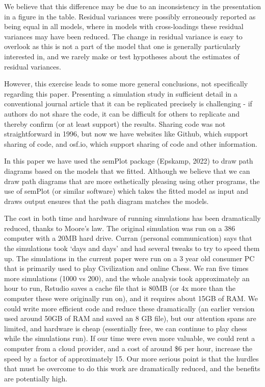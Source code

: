\documentclass[
  letterpaper,
  DIV=11,
  numbers=noendperiod]{scrartcl}
\begin{document}
We believe that this difference may be due to an inconsistency in the
presentation in a figure in the table. Residual variances were possibly
erroneously reported as being equal in all models, where in models with
cross-loadings these residual variances may have been reduced. The
change in residual variance is easy to overlook as this is not a part of
the model that one is generally particularly interested in, and we
rarely make or test hypotheses about the estimates of residual
variances.

However, this exercise leads to some more general conclusions, not
specifically regarding this paper. Presenting a simulation study in
sufficient detail in a conventional journal article that it can be
replicated precisely is challenging - if authors do not share the code,
it can be difficult for others to replicate and thereby confirm (or at
least support) the results. Sharing code was not straightforward in
1996, but now we have websites like Github, which support sharing of
code, and osf.io, which support sharing of code and other information.

In this paper we have used the semPlot package (Epskamp, 2022) to draw
path diagrams based on the models that we fitted. Although we believe
that we can draw path diagrams that are more esthetically pleasing using
other programs, the use of semPlot (or similar software) which takes the
fitted model as input and draws output ensures that the path diagram
matches the models.

The cost in both time and hardware of running simulations has been
dramatically reduced, thanks to Moore's law. The original simulation was
run on a 386 computer with a 20MB hard drive. Curran (personal
communication) says that the simulations took `days and days' and had
several tweaks to try to speed them up. The simulations in the current
paper were run on a 3 year old consumer PC that is primarily used to
play Civilization and online Chess. We ran five times more simulations
(1000 vs 200), and the whole analysis took approximately an hour to run,
Rstudio saves a cache file that is 80MB (or 4x more than the computer
these were originally run on), and it requires about 15GB of RAM. We
could write more efficient code and reduce these dramatically (an
earlier version used around 50GB of RAM and saved an 8 GB file), but our
attention spans are limited, and hardware is cheap (essentially free, we
can continue to play chess while the simulations run). If our time were
even more valuable, we could rent a computer from a cloud provider, and
a cost of around \$6 per hour, increase the speed by a factor of
approximately 15. Our more serious point is that the hurdles that must
be overcome to do this work are dramatically reduced, and the benefits
are potentially high.
\end{document}
